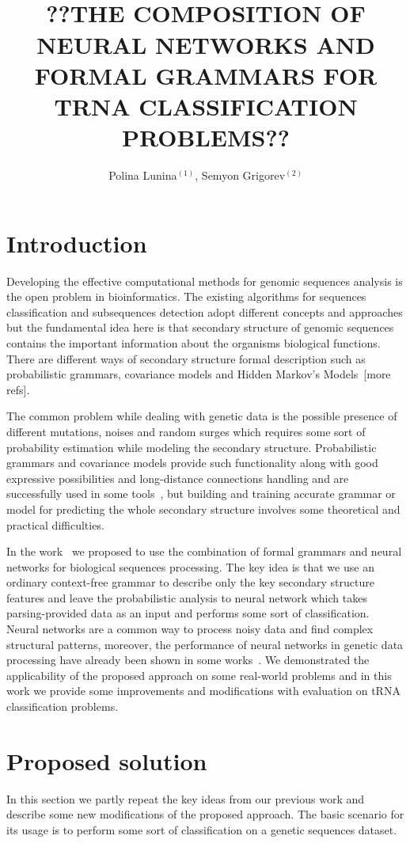 \documentclass[12pt,a4paper]{cibb}
\title{\large $\ $\\ \bf ??THE COMPOSITION OF NEURAL NETWORKS AND FORMAL GRAMMARS FOR TRNA CLASSIFICATION PROBLEMS??}
\author{ Polina Lunina$^{(1)}$, Semyon Grigorev$^{(2)}$}
\begin{document}
\thispagestyle{myheadings}
\pagestyle{myheadings}



\section{\bf Introduction}
 Developing the effective computational methods for genomic sequences analysis is the open problem in bioinformatics. The existing algorithms for sequences classification and subsequences detection adopt different concepts and approaches but the fundamental idea here is that secondary structure of genomic sequences contains the important information about the organisms biological functions. There are different ways of secondary structure formal description such as probabilistic grammars, covariance models and Hidden Markov’s Models~\cite{EddyDurbin}[more refs]. 

The common problem while dealing with genetic data is the possible presence of different mutations, noises and random surges which requires some sort of probability estimation while modeling the secondary structure. Probabilistic grammars and covariance models provide such functionality along with good expressive possibilities and long-distance connections handling and are successfully used in some tools~\cite{Infernal}, but building and training accurate grammar or model for predicting the whole secondary structure involves some theoretical and practical difficulties.

In the work~\cite{grigorevcomposition} we proposed to use the combination of formal grammars and neural networks for biological sequences processing. The key idea is that we use an ordinary context-free grammar to describe only the key secondary structure features and leave the probabilistic analysis to neural network which takes parsing-provided data as an input and performs some sort of classification. Neural networks are a common way to process noisy data and find complex structural patterns, moreover, the performance of neural networks in genetic data processing have already been shown in some works~\cite{Humidor,ANN}. We demonstrated the applicability of the proposed approach on some real-world problems and in this work we provide some improvements and modifications with evaluation on tRNA classification problems. 


\section{\bf Proposed solution}
In this section we partly repeat the key ideas from our previous work and describe some new modifications of the proposed approach. The basic scenario for its usage is to perform some sort of classification on a genetic sequences dataset. 
\end{document}
